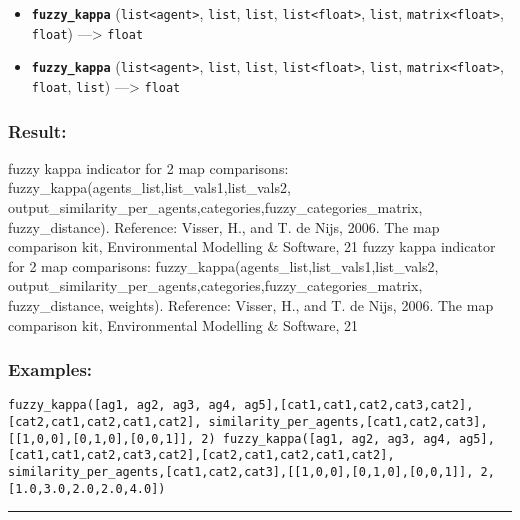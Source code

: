\documentclass[]{book}
\providecommand{\tightlist}{%
  \setlength{\itemsep}{0pt}\setlength{\parskip}{0pt}}
\theoremstyle{definition}
\theoremstyle{definition}
\theoremstyle{definition}
\theoremstyle{remark}
\begin{document}
\begin{itemize}
\tightlist
\item
  \textbf{\texttt{fuzzy\_kappa}}
  (\texttt{list\textless{}agent\textgreater{}}, \texttt{list},
  \texttt{list}, \texttt{list\textless{}float\textgreater{}},
  \texttt{list}, \texttt{matrix\textless{}float\textgreater{}},
  \texttt{float}) ---\textgreater{} \texttt{float}
\item
  \textbf{\texttt{fuzzy\_kappa}}
  (\texttt{list\textless{}agent\textgreater{}}, \texttt{list},
  \texttt{list}, \texttt{list\textless{}float\textgreater{}},
  \texttt{list}, \texttt{matrix\textless{}float\textgreater{}},
  \texttt{float}, \texttt{list}) ---\textgreater{} \texttt{float}
\end{itemize}

\subsubsection{Result:}\label{result-170}

fuzzy kappa indicator for 2 map comparisons:
fuzzy\_kappa(agents\_list,list\_vals1,list\_vals2,
output\_similarity\_per\_agents,categories,fuzzy\_categories\_matrix,
fuzzy\_distance). Reference: Visser, H., and T. de Nijs, 2006. The map
comparison kit, Environmental Modelling \& Software, 21 fuzzy kappa
indicator for 2 map comparisons:
fuzzy\_kappa(agents\_list,list\_vals1,list\_vals2,
output\_similarity\_per\_agents,categories,fuzzy\_categories\_matrix,
fuzzy\_distance, weights). Reference: Visser, H., and T. de Nijs, 2006.
The map comparison kit, Environmental Modelling \& Software, 21

\subsubsection{Examples:}\label{examples-131}

\begin{verbatim}
fuzzy_kappa([ag1, ag2, ag3, ag4, ag5],[cat1,cat1,cat2,cat3,cat2],[cat2,cat1,cat2,cat1,cat2], similarity_per_agents,[cat1,cat2,cat3],[[1,0,0],[0,1,0],[0,0,1]], 2) fuzzy_kappa([ag1, ag2, ag3, ag4, ag5],[cat1,cat1,cat2,cat3,cat2],[cat2,cat1,cat2,cat1,cat2], similarity_per_agents,[cat1,cat2,cat3],[[1,0,0],[0,1,0],[0,0,1]], 2, [1.0,3.0,2.0,2.0,4.0]) 
\end{verbatim}

\begin{center}\rule{0.5\linewidth}{\linethickness}\end{center}
\end{document}
